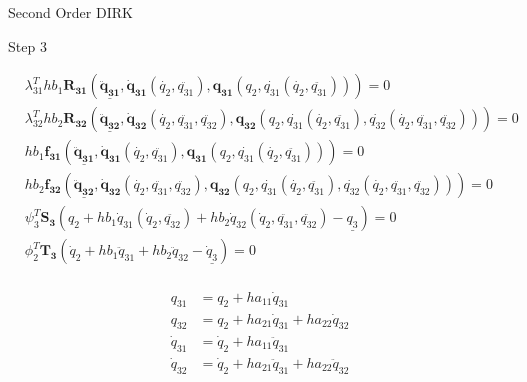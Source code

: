 \documentclass{beamer}
\begin{document}
\begin{frame}[allowframebreaks]{Second Order DIRK}
{\begin{block}{Step 3}
  \begin{minipage}{1.0\textwidth}
    \begin{minipage}{0.7\textwidth}
      \begin{equation}\nonumber
        \begin{split}
          &\lambda_{31}^T h b_1 \mathbf{R_{31}}\left(\underline{\mathbf{\ddot{q}_{31}}},
          \mathbf{\dot{q}_{31}}(\dot{q_2},\ddot{q_{31}}),
              \mathbf{{q}_{31}}(q_2,\dot{q_{31}}(\dot{q_2},\ddot{q_{31}}))\right) = 0 \\
          &\lambda_{32}^T h b_2  \mathbf{R_{32}}\left(\underline{\mathbf{\ddot{q}_{32}}},
              \mathbf{\dot{q}_{32}}(\dot{q_2},\ddot{q_{31}},\ddot{q_{32}}),
          \mathbf{{q}_{32}}(q_2,\dot{q_{31}}(\dot{q_2},\ddot{q_{31}}),\dot{q_{32}}(\dot{q_2},\ddot{q_{31}},\ddot{q_{32}}))\right) = 0 \\
          &h b_1 \mathbf{f_{31}}\left(\underline{\mathbf{\ddot{q}_{31}}},
          \mathbf{\dot{q}_{31}}(\dot{q_2},\ddot{q_{31}}),
              \mathbf{{q}_{31}}(q_2,\dot{q_{31}}(\dot{q_2},\ddot{q_{31}}))\right) = 0 \\
          &h b_2 \mathbf{f_{32}}\left(\underline{\mathbf{\ddot{q}_{32}}},
              \mathbf{\dot{q}_{32}}(\dot{q_2},\ddot{q_{31}},\ddot{q_{32}}),
          \mathbf{{q}_{32}}(q_2,\dot{q_{31}}(\dot{q_2},\ddot{q_{31}}),\dot{q_{32}}(\dot{q_2},\ddot{q_{31}},\ddot{q_{32}}))\right) = 0\\
          &\psi_3^T \mathbf{S_3}(q_2 + h b_1 \dot{q}_{31}(\dot{q}_2,\ddot{q_{32}}) +  h b_2 \dot{q}_{32}(\dot{q}_2,\ddot{q_{31}},\ddot{q_{32}}) - \underline{q_3} ) = 0\\
          &\phi_2^T \mathbf{T_3}(\dot{q}_2 + h b_1 \ddot{q}_{31} +  h b_2 \ddot{q}_{32} - \underline{\dot{q}_3} ) = 0\\
        \end{split}
      \end{equation}
    \end{minipage}
    \begin{minipage}{0.3\textwidth}
      \begin{equation}\nonumber
        \begin{split}
          q_{31} &= q_2 + h a_{11} \dot{q}_{31} \\
          q_{32} &= q_2 + h a_{21} \dot{q}_{31} + h a_{22} \dot{q}_{32} \\
          \dot{q}_{31} &= \dot{q}_2 + h a_{11} \ddot{q}_{31} \\
          \dot{q}_{32} &= \dot{q}_2 + h a_{21} \ddot{q}_{31} + h a_{22} \ddot{q}_{32} \\
        \end{split}
      \end{equation}
    \end{minipage}
  \end{minipage}
\end{block}
}


\end{frame}
\end{document}
